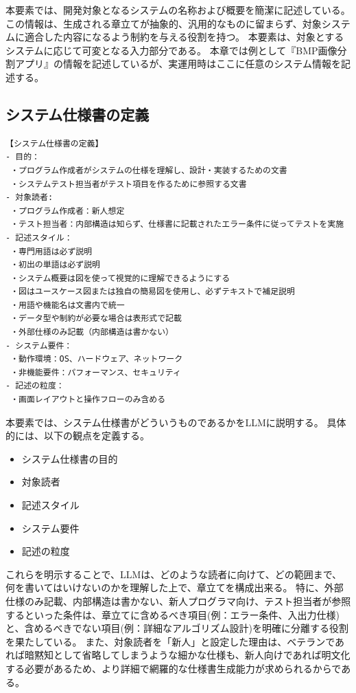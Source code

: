 本要素では、開発対象となるシステムの名称および概要を簡潔に記述している。
この情報は、生成される章立てが抽象的、汎用的なものに留まらず、対象システムに適合した内容になるよう制約を与える役割を持つ。
本要素は、対象とするシステムに応じて可変となる入力部分である。
本章では例として『BMP画像分割アプリ』の情報を記述しているが、実運用時はここに任意のシステム情報を記述する。
\subsection{システム仕様書の定義}

\begin{tcolorbox}[
  colback=white,
  colframe=black,
  fonttitle=\bfseries,
  breakable
]
\footnotesize
\ttfamily
\fontsize{11}{12}\selectfont
\begin{verbatim}
【システム仕様書の定義】
- 目的：
 ・プログラム作成者がシステムの仕様を理解し、設計・実装するための文書 
 ・システムテスト担当者がテスト項目を作るために参照する文書
- 対象読者:
 ・プログラム作成者：新人想定 
 ・テスト担当者：内部構造は知らず、仕様書に記載されたエラー条件に従ってテストを実施
- 記述スタイル：
 ・専門用語は必ず説明 
 ・初出の単語は必ず説明 
 ・システム概要は図を使って視覚的に理解できるようにする 
 ・図はユースケース図または独自の簡易図を使用し、必ずテキストで補足説明 
 ・用語や機能名は文書内で統一 
 ・データ型や制約が必要な場合は表形式で記載 
 ・外部仕様のみ記載（内部構造は書かない）
- システム要件：
 ・動作環境：OS、ハードウェア、ネットワーク 
 ・非機能要件：パフォーマンス、セキュリティ 
- 記述の粒度：
 ・画面レイアウトと操作フローのみ含める
\end{verbatim}
\end{tcolorbox}
\par\vspace{-20pt}
\label{fig:definition_of_system_specification}

本要素では、システム仕様書がどういうものであるかをLLMに説明する。
具体的には、以下の観点を定義する。
\begin{itemize}
  \item システム仕様書の目的
  \item 対象読者
  \item 記述スタイル
  \item システム要件
  \item 記述の粒度
\end{itemize}
これらを明示することで、LLMは、どのような読者に向けて、どの範囲まで、何を書いてはいけないのかを理解した上で、章立てを構成出来る。
特に、外部仕様のみ記載、内部構造は書かない、新人プログラマ向け、テスト担当者が参照するといった条件は、章立てに含めるべき項目(例：エラー条件、入出力仕様)と、含めるべきでない項目(例：詳細なアルゴリズム設計)を明確に分離する役割を果たしている。
また、対象読者を「新人」と設定した理由は、ベテランであれば暗黙知として省略してしまうような細かな仕様も、新人向けであれば明文化する必要があるため、より詳細で網羅的な仕様書生成能力が求められるからである。

